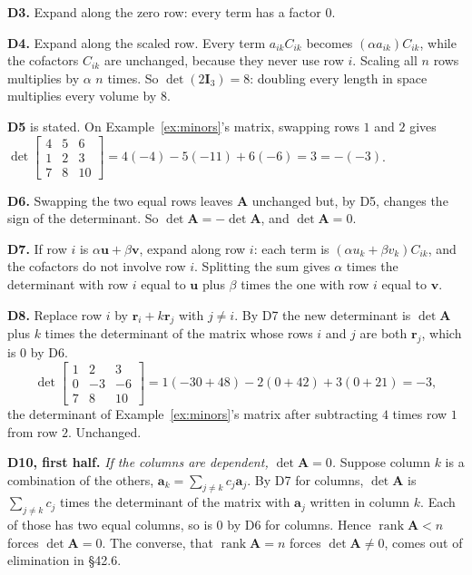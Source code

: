 \documentclass[11pt]{article}
\theoremstyle{plain}
\theoremstyle{definition}
\theoremstyle{remark}
\newcommand{\vc}[1]{\mathbf{#1}}
\newcommand{\mt}[1]{\mathbf{#1}}
\DeclareMathOperator{\rank}{rank}
\begin{document}
\textbf{D3.} Expand along the zero row: every term has a factor $0$.

\textbf{D4.} Expand along the scaled row. Every term $a_{ik}C_{ik}$ becomes
$(\alpha a_{ik})C_{ik}$, while the cofactors $C_{ik}$ are unchanged, because
they never use row $i$. Scaling all $n$ rows multiplies by $\alpha$ $n$ times.
So $\det(2\mt{I}_3)=8$: doubling every length in space multiplies every volume
by $8$.

\textbf{D5} is stated. On Example~\ref{ex:minors}'s matrix, swapping rows $1$
and $2$ gives
$\det\begin{bmatrix}4&5&6\\1&2&3\\7&8&10\end{bmatrix}=4(-4)-5(-11)+6(-6)=3=-(-3)$.

\textbf{D6.} Swapping the two equal rows leaves $\mt{A}$ unchanged but, by D5,
changes the sign of the determinant. So $\det\mt{A}=-\det\mt{A}$, and
$\det\mt{A}=0$.

\textbf{D7.} If row $i$ is $\alpha\vc{u}+\beta\vc{v}$, expand along row $i$: each
term is $(\alpha u_k+\beta v_k)C_{ik}$, and the cofactors do not involve row $i$.
Splitting the sum gives $\alpha$ times the determinant with row $i$ equal to
$\vc{u}$ plus $\beta$ times the one with row $i$ equal to $\vc{v}$.

\textbf{D8.} Replace row $i$ by $\vc{r}_i+k\vc{r}_j$ with $j\neq i$. By D7 the new
determinant is $\det\mt{A}$ plus $k$ times the determinant of the matrix whose
rows $i$ and $j$ are both $\vc{r}_j$, which is $0$ by D6.
\[
  \det\begin{bmatrix}1&2&3\\0&-3&-6\\7&8&10\end{bmatrix}
  =1(-30+48)-2(0+42)+3(0+21)=-3,
\]
the determinant of Example~\ref{ex:minors}'s matrix after subtracting $4$ times
row $1$ from row $2$. Unchanged.

\textbf{D10, first half.} \emph{If the columns are dependent, $\det\mt{A}=0$.}
Suppose column $k$ is a combination of the others,
$\vc{a}_k=\sum_{j\neq k}c_j\vc{a}_j$. By D7 for columns, $\det\mt{A}$ is
$\sum_{j\neq k}c_j$ times the determinant of the matrix with $\vc{a}_j$ written in
column $k$. Each of those has two equal columns, so is $0$ by D6 for columns.
Hence $\rank\mt{A}<n$ forces $\det\mt{A}=0$. The converse, that $\rank\mt{A}=n$
forces $\det\mt{A}\neq0$, comes out of elimination in \S42.6.

\end{document}
